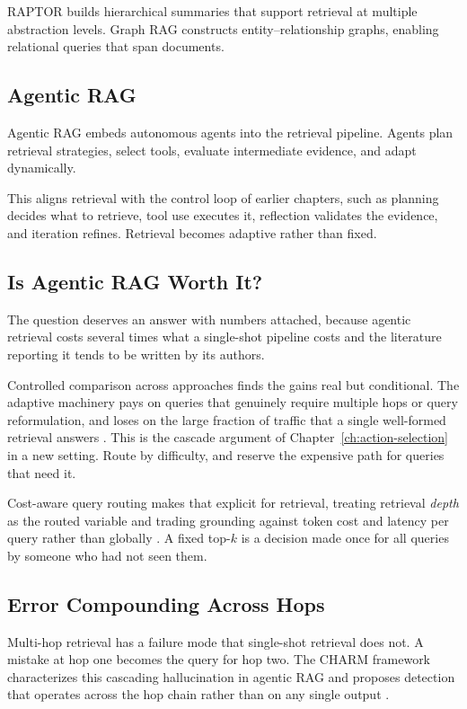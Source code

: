 RAPTOR \cite{raptor} builds hierarchical summaries that support retrieval at multiple abstraction levels. Graph RAG \cite{graphrag} constructs entity–relationship graphs, enabling relational queries that span documents.

\subsection{Agentic RAG}

Agentic RAG \cite{agenticrag2025} embeds autonomous agents into the retrieval pipeline. Agents plan retrieval strategies, select tools, evaluate intermediate evidence, and adapt dynamically.

This aligns retrieval with the control loop of earlier chapters, such as planning decides
what to retrieve, tool use executes it, reflection validates the evidence, and
iteration refines. Retrieval becomes adaptive rather than fixed.

\subsection{Is Agentic RAG Worth It?}

The question deserves an answer with numbers attached, because agentic retrieval
costs several times what a single-shot pipeline costs and the literature reporting
it tends to be written by its authors.

Controlled comparison across approaches finds the gains real but conditional. The
adaptive machinery pays on queries that genuinely require multiple hops or query
reformulation, and loses on the large fraction of traffic that a single well-formed
retrieval answers \cite{isagenticrag2026}. This is the cascade argument of
Chapter~\ref{ch:action-selection} in a new setting. Route by difficulty, and reserve the expensive path for queries that need it.

Cost-aware query routing makes that explicit for retrieval, treating retrieval
\emph{depth} as the routed variable and trading grounding against token cost and
latency per query rather than globally \cite{ragrouting2026}. A fixed top-$k$ is a
decision made once for all queries by someone who had not seen them.

\subsection{Error Compounding Across Hops}

Multi-hop retrieval has a failure mode that single-shot retrieval does not. A
mistake at hop one becomes the query for hop two. The CHARM framework
characterizes this cascading hallucination in agentic RAG and proposes detection
that operates across the hop chain rather than on any single output
\cite{charm2026}.

